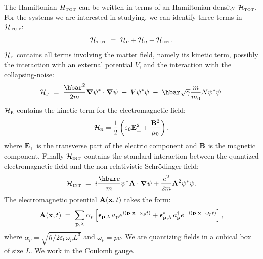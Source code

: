 \documentclass[12pt,onecolumn,amssymb,nofootinbib]{revtex4-2} %
\newcommand*{\boldvec}[1]{\ensuremath{\boldsymbol{#1}}}%
\let\vec\boldvec%
\begin{document}
The Hamiltonian $H_{\text{\tiny TOT}}$ can be written in terms of an
Hamiltonian density ${\mathcal H}_{\text{\tiny TOT}}$. For the systems we are
interested in studying, we can identify three terms in ${\mathcal
H}_{\text{\tiny TOT}}$:
\begin{equation}
{\mathcal H}_{\text{\tiny TOT}} \; = \; {\mathcal H}_{\text{\tiny P}} +
{\mathcal H}_{\text{\tiny R}} + {\mathcal H}_{\text{\tiny INT}}.
\end{equation}
${\mathcal H}_{\text{\tiny P}}$ contains all terms involving the matter field,
namely its kinetic term, possibly the interaction with an external potential
$V$, and the interaction with the collapsing-noise:
\begin{equation}
{\mathcal H}_{\text{\tiny P}} \; = \; \frac{\hbar^{2}}{2m} \vec{\nabla}\psi^{*}
\cdot \vec{\nabla}\psi \; + \;  V \psi^{*}\psi \; - \; \hbar \sqrt{\gamma} \frac{
m}{m_{0}} N \psi^{*}\psi.
\end{equation}
${\mathcal H}_{\text{\tiny R}}$ contains the kinetic term for the
electromagnetic field:
\begin{equation}
{\mathcal H}_{\text{\tiny R}} = \frac{1}{2}\left(\varepsilon_{0}\mathbf{E}_{\perp}^{2}
+ \frac{\mathbf{B}^{2}}{\mu_{0}}\right),
\end{equation}
where $\mathbf{E}_{\perp}$ is the transverse part of the electric component and
${\bf B}$ is the magnetic component. Finally ${\mathcal H}_{\text{\tiny INT}}$
contains the standard interaction between the quantized electromagnetic field
and the non-relativistic Schr\"odinger field:
\begin{equation}
{\mathcal H}_{\text{\tiny INT}} \; = \; i\frac{\hbar e}{m} \psi^{*}\mathbf{A}\cdot
\vec{\nabla}\psi + \frac{e^{2}}{2m}\mathbf{A}^{2}\psi^{*}\psi.
\end{equation}
The electromagnetic potential ${\bf A}({\bf x},t)$ takes the form:
\begin{equation}
{\bf A}({\bf x},t) \; = \; \sum_{{\bf p}, \lambda} \alpha_p
\left[ \vec{\epsilon}_{{\bf p}, \lambda}\, a_{\bf p} e^{i({\bf p \cdot
x} - \omega_p t)} + \vec{\epsilon}_{{\bf p}, \lambda}^{*}\, a_{\bf p}^{\dagger} e^{-i({\bf p
\cdot x} -
\omega_p t)} \right],
\end{equation}
where $\alpha_{p}=\sqrt{\hbar/2\varepsilon_{0}\omega_{p}L^{3}}$ and
$\omega_{p}=pc$. We are quantizing fields in a cubical box of size $L$. We work in the Coulomb gauge.
\end{document}
